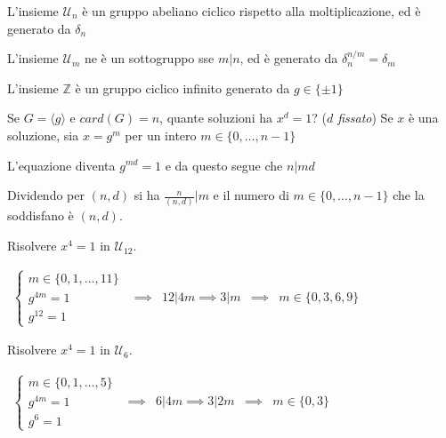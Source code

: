\documentclass[11pt]{article}
\newcommand{\calU}{\mathcal{U}}
\begin{document}
    L'insieme $\calU_n$ è un gruppo abeliano ciclico rispetto alla moltiplicazione, ed è generato da $\delta_n$

    L'insieme $\calU_m$ ne è un sottogruppo sse $m|n$, ed è generato da $\delta_n^{n/m}=\delta_m$

    \begin{example}{}{}
        L'insieme $\mathbb{Z}$ è un gruppo ciclico infinito generato da $g \in \{\pm 1\}$
    \end{example}
    
    
    \begin{problem}{}{}
        Se $G = \langle g \rangle$ e $card(G) = n$, quante soluzioni ha $x^d = 1$? (\textit{$d$ fissato})
        \tcblower
        Se $x$ è una soluzione, sia $x = g^m$ per un intero $m \in \{0, \dots, n-1\}$

        L'equazione diventa $g^{md} = 1$ e da questo segue che $n|md$

        Dividendo per $(n,d)$ si ha $\frac{n}{(n,d)}|m$ e il numero di $m \in \{0, \dots, n-1\}$ che la soddisfano è $(n,d)$.
        \begin{example}{}{}
            Risolvere $x^4 = 1$ in $\calU_{12}$.

            $\begin{array}{lllll}
                \begin{cases}
                    m \in \{0,1,\dots,11\} \\
                    g^{4m} = 1 \\
                    g^{12} = 1
                \end{cases} &
                \implies &
                12|4m \implies 3|m &
                \implies &
                m \in \{0,3,6,9\}
            \end{array}$

            \tcblower
            
            Risolvere $x^4 = 1$ in $\calU_{6}$.
            
            $\begin{array}{lllll}
                \begin{cases}
                    m \in \{0,1,\dots,5\} \\
                    g^{4m} = 1 \\
                    g^{6} = 1
                \end{cases} &
                \implies &
                6|4m \implies 3|2m &
                \implies &
                m \in \{0,3\}
            \end{array}$
        \end{example}
    \end{problem}
\end{document}
